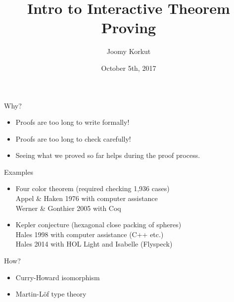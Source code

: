 \documentclass{beamer}
\title{Intro to Interactive Theorem Proving}
\author{Joomy Korkut}
\institute{Wesleyan University}
\date{October 5th, 2017}
\begin{document}
\begin{frame}
\titlepage
\begin{center}
{\footnotesize{}}
\end{center}
\end{frame}

\begin{frame}{Why?}
\begin{itemize}
\item<1-> Proofs are too long to write formally!
\item<2-> Proofs are too long to check carefully!
\item<3-> Seeing what we proved so far helps during the proof process.
\end{itemize}
\end{frame}

\begin{frame}{Examples}
\begin{itemize}
  \item<1-> Four color theorem (required checking 1,936 cases)
  \\ Appel \& Haken 1976 with computer assistance
  \\ Werner \& Gonthier 2005 with Coq
  \item<2-> Kepler conjecture (hexagonal close packing of spheres)
  \\ Hales 1998 with computer assistance (C++ etc.)
  \\ Hales 2014 with HOL Light and Isabelle (Flyspeck)
\end{itemize}
\end{frame}

\begin{frame}{How?}
\begin{itemize}
\item<1-> Curry-Howard isomorphism
\item<2-> Martin-L\"{o}f type theory
\end{itemize}
\end{frame}
\end{document}
